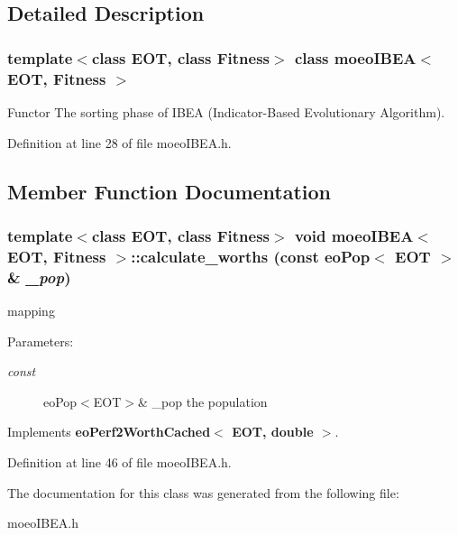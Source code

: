 \subsection{Detailed Description}
\subsubsection*{template$<$class EOT, class Fitness$>$ class moeo\-IBEA$<$ EOT, Fitness $>$}

Functor The sorting phase of IBEA (Indicator-Based Evolutionary Algorithm). 



Definition at line 28 of file moeo\-IBEA.h.

\subsection{Member Function Documentation}
\subsubsection{\setlength{\rightskip}{0pt plus 5cm}template$<$class EOT, class Fitness$>$ void {\bf moeo\-IBEA}$<$ EOT, Fitness $>$::calculate\_\-worths (const {\bf eo\-Pop}$<$ EOT $>$ \& {\em \_\-pop})\hspace{0.3cm}{\tt  [inline, virtual]}}\label{classmoeoIBEA_9e8738189ef146eb2e6ecb19c9709a31}


mapping 

\begin{Desc}
\item[Parameters:]
\begin{description}
\item[{\em const}]eo\-Pop$<$EOT$>$\& \_\-pop the population \end{description}
\end{Desc}


Implements {\bf eo\-Perf2Worth\-Cached$<$ EOT, double $>$}.

Definition at line 46 of file moeo\-IBEA.h.

The documentation for this class was generated from the following file:\begin{CompactItemize}
\item 
moeo\-IBEA.h\end{CompactItemize}
